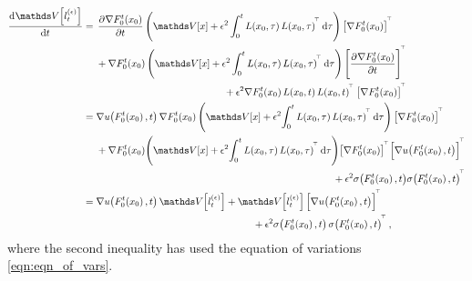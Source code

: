\begin{align*}
	\dod{\var{l_t^{(\epsilon)}}}{t} & = \begin{multlined}[t]
		                                    \dpd{\nabla F_0^t\!\left(x_0\right)}{t}\left(\var{x} + \epsilon^2 \int_0^t{L\!\left(x_0, \tau\right)L\!\left(x_0, \tau\right)^{\T}\dif\tau} \right)\left[\nabla F_0^t\!\left(x_0\right)\right]^{\T} \\
		                                    + \nabla F_0^t\!\left(x_0\right)\left(\var{x} + \epsilon^2 \int_0^t{L\!\left(x_0, \tau\right)L\!\left(x_0, \tau\right)^{\T}\dif\tau} \right)\left[\dpd{\nabla F_0^t\!\left(x_0\right)}{t}\right]^{\T} \\
		                                    + \epsilon^2\nabla F_0^t\!\left(x_0\right)L\!\left(x_0, t\right) L\!\left(x_0, t\right)^{\T}\left[\nabla F_0^t\!\left(x_0\right)\right]^{\T}
	                                    \end{multlined}                                                                   \\
	                                & = \begin{multlined}[t]
		                                    \nabla u\!\left(F_0^t\!\left(x_0\right), t\right)\nabla F_0^t\!\left(x_0\right)\left(\var{x} + \epsilon^2\!\int_0^t{L\!\left(x_0, \tau\right)L\!\left(x_0, \tau\right)^{\T}\dif\tau} \right)\left[\nabla F_0^t\!\left(x_0\right)\right]^{\T} \\
		                                    +\nabla F_0^t\!\left(x_0\right)\!\left(\var{x} + \epsilon^2\!\int_0^t{L\!\left(x_0, \tau\right)L\!\left(x_0, \tau\right)^{\T}\dif\tau} \right)\!\left[\nabla F_0^t\!\left(x_0\right)\right]^{\T}\!\left[\nabla u\!\left(F_0^t\!\left(x_0\right), t\right)\right]^{\T} \\
		                                    + \epsilon^2\sigma\!\left(F_0^t\!\left(x_0\right), t\right)\!\sigma\!\left(F_0^t\!\left(x_0\right), t\right)^{\T}
	                                    \end{multlined} \\
	                                & = \begin{multlined}[t]
		                                    \nabla u\!\left(F_0^t\!\left(x_0\right), t\right) \var{l_t^{(\epsilon)}} + \var{l_t^{(\epsilon)}}\left[\nabla u\!\left(F_0^t\!\left(x_0\right), t\right)\right]^{\T} \\
		                                    + \epsilon^2\sigma\!\left(F_0^t\!\left(x_0\right), t\right)\sigma\!\left(F_0^t\!\left(x_0\right), t\right)^{\T},
	                                    \end{multlined}
\end{align*}
where the second inequality has used the equation of variations \cref{eqn:eqn_of_vars}.



